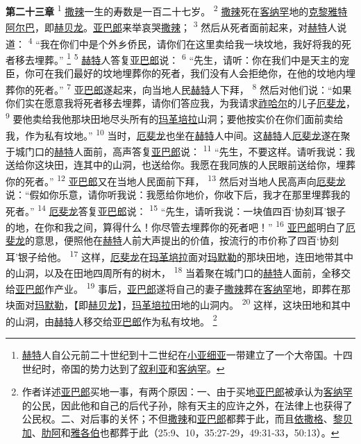 \textbf{第二十三章\quad}
\textsuperscript{1}
\uline{撒辣}一生的寿数是一百二十七岁。
\textsuperscript{2}
\uline{撒辣}死在\uline{客纳罕}地的\uline{克黎雅特阿尔巴}，即\uline{赫贝龙}。\uline{亚巴郎}来举哀哭\uline{撒辣}；
\textsuperscript{3}
然后从死者面前起来，对\uline{赫特}人说道：
\textsuperscript{4}
“我在你们中是个外乡侨民，请你们在这里卖给我一块坟地，我好将我的死者移去埋葬。”
\footnote{\uline{赫特}人自公元前二十世纪到十二世纪在\uline{小亚细亚}一带建立了一个大帝国。十四世纪时，帝国的势力达到了\uline{叙利亚}和\uline{客纳罕}。}
\textsuperscript{5}
\uline{赫特}人答复\uline{亚巴郎}说：
\textsuperscript{6}
“先生，请听：你在我们中是天主的宠臣，你可在我们最好的坟地埋葬你的死者，我们没有人会拒绝你，在他的坟地内埋葬你的死者。”
\textsuperscript{7}
\uline{亚巴郎}遂起来，向当地人民\uline{赫特}人下拜，
\textsuperscript{8}
然后对他们说：“如果你们实在愿意我将死者移去埋葬，请你们答应我，为我请求\uline{祚哈尔}的儿子\uline{厄斐龙}，
\textsuperscript{9}
要他卖给我他那块田地尽头所有的\uline{玛革}\uline{培拉}山洞；要他按实价在你们面前卖给我，作为私有坟地。”
\textsuperscript{10}
当时，\uline{厄斐龙}也坐在\uline{赫特}人中间。这\uline{赫特}人\uline{厄斐龙}遂在聚于城门口的\uline{赫特}人面前，高声答复\uline{亚巴郎}说：
\textsuperscript{11}
“先生，不要这样。请听我说：我送给你这块田，连其中的山洞，也送给你。我愿在我同族的人民眼前送给你，埋葬你的死者。”
\textsuperscript{12}
\uline{亚巴郎}又在当地人民面前下拜，
\textsuperscript{13}
然后对当地人民高声向\uline{厄斐龙}说：“假如你乐意，请你听我说：我愿给你地价，你收下后，我才在那里埋葬我的死者。”
\textsuperscript{14}
\uline{厄斐龙}答复\uline{亚巴郎}说：
\textsuperscript{15}
“先生，请听我说：一块值四百‘协刻耳’银子的地，在你和我之间，算得什么！你尽管去埋葬你的死者吧！”
\textsuperscript{16}
\uline{亚巴郎}明白了\uline{厄斐龙}的意思，便照他在\uline{赫特}人前大声提出的价值，按流行的市价称了四百‘协刻耳’银子给他。
\textsuperscript{17}
这样，\uline{厄斐龙}在\uline{玛革}\uline{培拉}面对\uline{玛默勒}的那块田地，连田地带其中的山洞，以及在田地四周所有的树木，
\textsuperscript{18}
当着聚在城门口的\uline{赫特}人面前，全移交给\uline{亚巴郎}作产业。
\textsuperscript{19}
事后，\uline{亚巴郎}遂将自己的妻子\uline{撒辣}葬在\uline{客纳罕}地，即葬在那块面对\uline{玛默勒}，【即\uline{赫贝龙}】，\uline{玛革}\uline{培拉}田地的山洞内。
\textsuperscript{20}
这样，这块田地和其中的山洞，由\uline{赫特}人移交给\uline{亚巴郎}作为私有坟地。
\footnote{作者详述\uline{亚巴郎}买地一事，有两个原因：一、由于买地\uline{亚巴郎}被承认为\uline{客纳罕}的公民，因此他和自己的后代子孙，除有天主的应许之外，在法律上也获得了公民权。二、对后事的关怀；不但\uline{撒辣}和\uline{亚巴郎}都葬于此，而且\uline{依撒格}、\uline{黎贝加}、\uline{肋阿}和\uline{雅各伯}也都葬于此（25:9、10，35:27-29，49:31-33，50:13）。}

